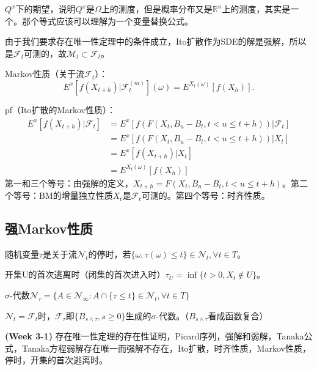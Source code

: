 $Q^x$下的期望，说明$Q^x$是$\Omega$上的测度，但是概率分布又是$\mathbb{R}^n$上的测度，其实是一个。那个等式应该可以理解为一个变量替换公式。

由于我们要求存在唯一性定理中的条件成立，Ito扩散作为SDE的解是强解，所以是$\mathcal{F}_t$可测的，故$\mathcal{M}_t \subset \mathcal{F}_t$。

Markov性质（关于流$\mathcal{F}_t$）：
\[
  E^{x}\left[f\left(X_{t+h}\right) | \mathcal{F}_{t}^{(m)}\right](\omega)=E^{X_{t}(\omega)}\left[f\left(X_{h}\right)\right].
\]

pf（Ito扩散的Markov性质）：\[
  \begin{aligned}
    E^{x}\left[f\left(X_{t+h}\right) | \mathcal{F}_{t}\right] & =E^{x}\left[f\left(F\left(X_{t}, B_{u}-B_{t}, t<u \leq t+h\right)\right) | \mathcal{F}_{t}\right] \\
    & =E^{x}\left[f\left(F\left(X_{t}, B_{u}-B_{t}, t<u \leq t+h\right)\right) | X_{t}\right] \\
    & =E^{x}\left[f\left(X_{t+h}\right) | X_{t}\right] \\
    & =E^{X_{t}(\omega)}\left[f\left(X_{h}\right)\right]
  \end{aligned}
\]
第一和三个等号：由强解的定义，$X_{t+h} = F\left(X_{t}, B_{u}-B_{t}, t<u \leq t+h\right)$。第二个等号：BM的增量独立性质$X_{t}$是$\mathcal{F}_t$可测的。第四个等号：时齐性质。

\subsection{强Markov性质}

随机变量$\tau$是关于流$\mathcal{N}_t$的停时，若$\{\omega, \tau(\omega) \le t\} \in \mathcal{N}_t, \forall t \in T$。

开集U的首次逃离时（闭集的首次进入时）$\tau_U = \inf \{t > 0, X_t \notin U\}$。

$\sigma$-代数$\mathcal{N}_{\tau} = \{ A \in \mathcal{N}_{\infty}: A \cap \{ \tau \le t \} \in \mathcal{N}_t, \forall t \in T \}$

$\mathcal{N}_{t}=\mathcal{F}_{t}$时，$\mathcal{F}_{\tau}$即$\{B_{s \wedge \tau}, s \geq 0\}$生成的$\sigma$-代数。（$B_{s \wedge \tau}$看成函数复合）

\begin{conc}
  \textbf{(Week 3-1)} 存在唯一性定理的存在性证明，Picard序列，强解和弱解，Tanaka公式，Tanaka方程弱解存在唯一而强解不存在，Ito扩散，时齐性质，Markov性质，停时，开集的首次逃离时。
\end{conc}

